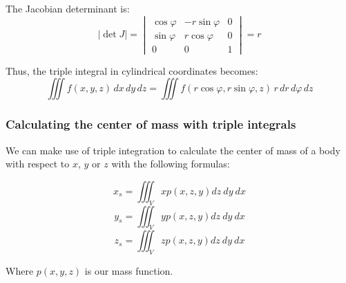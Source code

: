 The Jacobian determinant is:
\[
\left| \det J \right| =
\begin{vmatrix}
\cos \varphi & -r \sin \varphi & 0 \\
\sin \varphi & r \cos \varphi & 0 \\
0 & 0 & 1
\end{vmatrix}
= r
\]

Thus, the triple integral in cylindrical coordinates becomes:
\[
\iiint f(x, y, z)\, dx\, dy\, dz = \iiint f(r \cos \varphi, r \sin \varphi, z)\, r\, dr\, d\varphi\, dz
\]

\subsubsection{Calculating the center of mass with triple integrals}

We can make use of triple integration to calculate the center of mass of a body with
respect to \(x\), \(y\) or \(z\) with the following formulas:

\[x_s = \iiint_V xp(x,z,y)dz\ dy \ dx\]
\[y_s = \iiint_V yp(x,z,y)dz\ dy \ dx\]
\[z_s = \iiint_V zp(x,z,y)dz\ dy \ dx\]

Where \(p(x,y,z)\) is our mass function.
